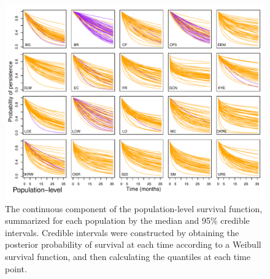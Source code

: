 \documentclass[12pt, oneside]{article}   	%
\begin{document}
\clearpage
\newpage




 \begin{figure}[!h]
   \centering
       \includegraphics[page=2,width=1\textwidth]{../../figures/survival-function-population.pdf}  
    \caption{ The continuous component of the population-level survival function, summarized for each population by the median and 95\% credible intervals. Credible intervals were constructed by obtaining the posterior probability of survival at each time according to a Weibull survival function, and then calculating the quantiles at each time point.  }
 \label{fig:viability-estimates-population}
\end{figure}
\end{document}
